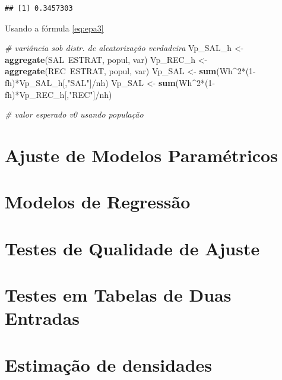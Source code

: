 \documentclass[]{book}
\newenvironment{Shaded}{\begin{snugshade}}{\end{snugshade}}
\newcommand{\KeywordTok}[1]{\textcolor[rgb]{0.13,0.29,0.53}{\textbf{{#1}}}}
\newcommand{\DecValTok}[1]{\textcolor[rgb]{0.00,0.00,0.81}{{#1}}}
\newcommand{\StringTok}[1]{\textcolor[rgb]{0.31,0.60,0.02}{{#1}}}
\newcommand{\CommentTok}[1]{\textcolor[rgb]{0.56,0.35,0.01}{\textit{{#1}}}}
\newcommand{\NormalTok}[1]{{#1}}
\numberwithin{example}{chapter}
\numberwithin{remark}{chapter}
\numberwithin{definition}{chapter}
\begin{document}
\begin{verbatim}
## [1] 0.3457303
\end{verbatim}

Usando a fórmula \eqref{eq:epa3}

\begin{Shaded}
\begin{Highlighting}[]
\CommentTok{# variância sob distr. de aleatorização verdadeira}
\NormalTok{Vp_SAL_h <-}\StringTok{ }\KeywordTok{aggregate}\NormalTok{(SAL~ESTRAT, popul, var)}
\NormalTok{Vp_REC_h <-}\StringTok{ }\KeywordTok{aggregate}\NormalTok{(REC~ESTRAT, popul, var)}
\NormalTok{Vp_SAL <-}\StringTok{ }\KeywordTok{sum}\NormalTok{(Wh^}\DecValTok{2}\NormalTok{*(}\DecValTok{1}\NormalTok{-fh)*Vp_SAL_h[,}\StringTok{"SAL"}\NormalTok{]/nh)}
\NormalTok{Vp_SAL <-}\StringTok{ }\KeywordTok{sum}\NormalTok{(Wh^}\DecValTok{2}\NormalTok{*(}\DecValTok{1}\NormalTok{-fh)*Vp_REC_h[,}\StringTok{"REC"}\NormalTok{]/nh)}
\end{Highlighting}
\end{Shaded}

\begin{Shaded}
\begin{Highlighting}[]
\CommentTok{# valor esperado v0 usando população}
\end{Highlighting}
\end{Shaded}

\chapter{Ajuste de Modelos Paramétricos}\label{ajmodpar}

\chapter{Modelos de Regressão}\label{modreg}

\chapter{Testes de Qualidade de Ajuste}\label{testqualajust}

\chapter{Testes em Tabelas de Duas Entradas}\label{testetab2}

\chapter{Estimação de densidades}\label{estimacao-de-densidades}
\end{document}
